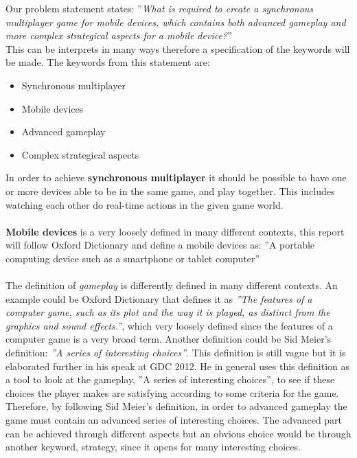 Our problem statement states: ''\textit{What is required to create a synchronous multiplayer game for mobile devices, which contains both advanced
gameplay and more complex strategical aspects for a mobile device?}''\\
This can be interprets in many ways therefore a specification of the keywords will be made.
The keywords from this statement are:
\begin{itemize}
\item Synchronous multiplayer
\item Mobile devices
\item Advanced gameplay
\item Complex strategical aspects
\end{itemize}
In order to achieve \textbf{synchronous multiplayer} it should be possible to have one or more devices able to be in the same game, and play together. This includes watching each other do real-time actions in the given game world.\\\\
\textbf{Mobile devices} is a very loosely defined in many different contexts, this report will follow Oxford Dictionary and define a mobile devices as: ''A portable computing device such as a smartphone or tablet computer''\cite{mobileOx}\\\\
The definition of \textit{gameplay} is differently defined in many different contexts. An example could be Oxford Dictionary that defines it as \textit{''The features of a computer game, such as its plot and the way it is played, as distinct from the graphics and sound effects.''}\cite{gameplayOx}, which very loosely defined since the features of a computer game is a very broad term. Another definition could be Sid Meier's definition: \textit{''A series of interesting choices''}\cite{GDC2012}. This definition is still vague but it is elaborated further in his speak at GDC 2012.\cite{GDC2012}
He in general uses this definition as a tool to look at the gameplay, ''A series of interesting choices'', to see if these choices the player makes are satisfying according to some criteria for the game.\\
Therefore, by following Sid Meier's definition, in order to advanced gameplay the game must contain an advanced series of interesting choices.
The advanced part can be achieved through different aspects but an obvious choice would be through another keyword, strategy, since it opens for many interesting choices.\\\\
